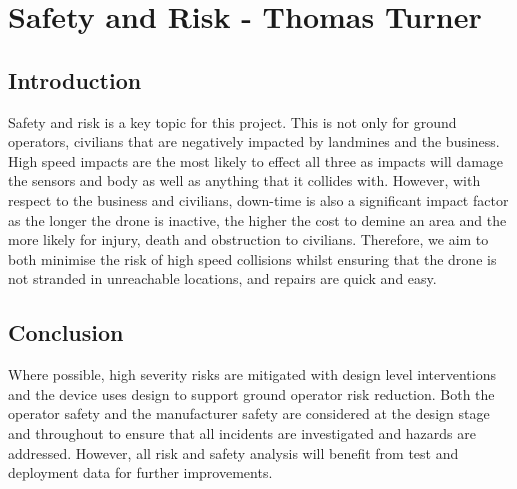 \section{Safety and Risk - Thomas Turner}\label{Safety and Risk}
\subsection{Introduction}\label{sub_section:tgt_safety_intro}
Safety and risk is a key topic for this project. This is not only for ground operators, civilians that are negatively impacted by landmines and the business. High speed impacts are the most likely to effect all three as impacts will damage the sensors and body as well as anything that it collides with. However, with respect to the business and civilians, down-time is also a significant impact factor as the longer the drone is inactive, the higher the cost to demine an area and the more likely for injury, death and obstruction to civilians. Therefore, we aim to both minimise the risk of high speed collisions whilst ensuring that the drone is not stranded in unreachable locations, and repairs are quick and easy.


\subsection{Conclusion}
Where possible, high severity risks are mitigated with design level interventions and the device uses design to support ground operator risk reduction. Both the operator safety and the manufacturer safety are considered at the design stage and throughout to ensure that all incidents are investigated and hazards are addressed. However, all risk and safety analysis will benefit from test and deployment data for further improvements.